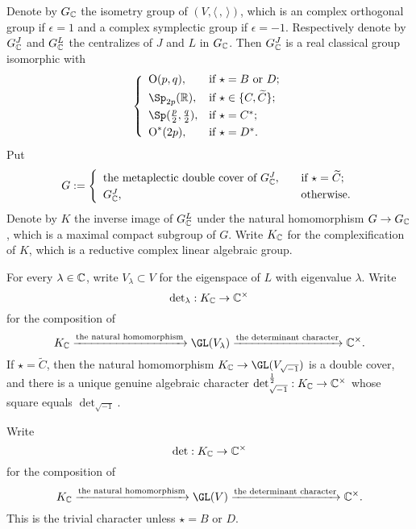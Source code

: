 \documentclass[12pt,a4paper]{amsart}
\newcommand{\oO}{\operatorname{O}}
\newcommand{\R}{\mathbb R}
\newcommand{\la}{\langle}
\newcommand{\ra}{\rangle}
\newcommand{\be}{\begin {equation}}
\newcommand{\ee}{\end {equation}}
\numberwithin{equation}{section}
\theoremstyle{remark}
\begin{document}
Denote by $G_{\mathbb{C}}$ the isometry group of $ (V, \la\,,\,\ra)$, which is an complex orthogonal group if $\epsilon=1$ and a complex symplectic group if $\epsilon=-1$. Respectively denote by  $G_{\mathbb{C}}^{J}$  and  $G_{\mathbb{C}}^{L}$ the centralizes of $J$ and $L$ in  $G_{\mathbb{C}}$. Then $G_{\mathbb{C}}^{J}$ is a real classical group isomorphic with
\[
 \left\{
     \begin{array}{ll}
         \oO(p, q), &\hbox{if $\star=B$ or $D$}; \smallskip\\
            \Sp_{2p}(\R), &\hbox{if $\star\in \{C,\widetilde C\}$}; \smallskip\\
                   \Sp(\frac{p}{2}, \frac{q}{2}), &\hbox{if $\star=C^*$}; \smallskip \\
          \oO^*(2p), &\hbox{if $\star=D^*$}.\\
            \end{array}
   \right.
\]
Put
\[
G:= \left\{
     \begin{array}{ll}
       \textrm{the metaplectic double cover of $G_{\C}^{J}$}, \quad &\hbox{if $\star=\widetilde C$}; \smallskip\\
            G_{\C}^{J},  \quad  &\hbox{otherwise}.\\
            \end{array}
   \right.
\]
Denote by $K$ the inverse image of  $G_{\mathbb{C}}^{L}$  under the natural homomorphism $G\rightarrow G_{\mathbb{C}}$, which is a maximal compact subgroup of $G$. Write $K_{\mathbb{C}}$ for the complexification of  $K$, which is a reductive complex linear algebraic group.

For every $\lambda\in \mathbb{C}$, write $V_{\lambda}\subset V$ for the eigenspace of $L$ with eigenvalue $\lambda$. Write
\[
{\det}_\lambda : K_{\mathbb{C}}\rightarrow \mathbb{C}^\times
\]
for the composition of
\be\label{comdet}
   K_{\C}\xrightarrow{\textrm{the natural homomorphism}} \GL(V_{\lambda})\xrightarrow{\textrm{the determinant character}}\C^\times.
\ee
If $\star=\widetilde C$, then the natural homomorphism  $ K_{\C}\rightarrow \GL(V_{\sqrt{-1}})$ is a double cover, and there is a unique genuine algebraic character
$\det_{\sqrt{-1}}^{\frac{1}{2}}:  K_{\mathbb{C}}\rightarrow \mathbb{C}^\times $ whose square equals $\det_{\sqrt{-1}}$.

Write
\[
{\det} : K_{\mathbb{C}}\rightarrow \mathbb{C}^\times
\]
for the composition of
\be\label{comdet}
   K_{\C}\xrightarrow{\textrm{the natural homomorphism}} \GL(V)\xrightarrow{\textrm{the determinant character}}\C^\times.
\ee
This is the trivial character unless $\star=B$ or $D$.
\end{document}
